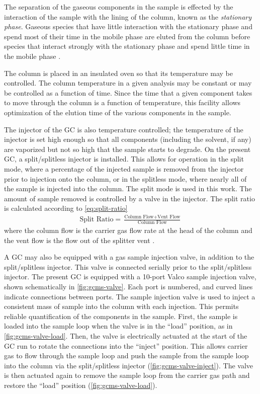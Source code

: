 \documentclass[../main.tex]{subfiles}
\begin{document}
The separation of the gaseous components in the sample is effected by
the interaction of the sample with the lining of the column, known as the
\textit{stationary phase}. Gaseous species that have little interaction with
the stationary phase and spend most of their time in the mobile phase
are eluted from the column before species that interact strongly with
the stationary phase and spend little time in the mobile phase \cite{Sparkman2011a}.

The column is placed in an insulated oven so that its temperature may be
controlled. The column temperature in a given analysis may be constant
or may be controlled as a function of time. Since the time that a given
component takes to move through the column is a function of temperature,
this facility allows optimization of the elution time of the various
components in the sample.

The injector of the GC is also temperature controlled; the temperature of
the injector is set high enough so that all components (including the solvent,
if any) are vaporized but not so high that the sample starts to degrade. On the present GC,
a split/splitless injector is installed. This allows for operation in the
split mode, where a percentage of the injected sample is removed from the
injector prior to injection onto the column, or in the splitless mode,
where nearly all of the sample is injected into the column. The split mode
is used in this work. The amount of sample removed is controlled by a valve
in the injector. The split ratio is calculated according to \cref{eq:split-ratio}
%
\begin{gather}
\label{eq:split-ratio}
\text{Split Ratio} = \frac{\text{Column Flow} +\text{Vent Flow}}{\text{Column Flow}}
\end{gather}
%
where the column flow is the carrier gas flow rate at the head of the column
and the vent flow is the flow out of the splitter vent \cite{Sparkman2011a}.

A GC may also be equipped with a gas sample injection valve, in addition to the
split/splitless injector. This valve is connected serially prior to the
split/splitless injector. The present GC is equipped with a 10-port Valco sample
injection valve, shown schematically in \cref{fig:gcms-valve}.
Each port is numbered, and curved lines indicate connections between ports.
The sample injection valve is used to inject a consistent mass of sample into the column
with each injection. This permits reliable quantification of the
components in the sample. First, the sample is loaded into the sample loop
when the valve is in the ``load'' position, as in \cref{fig:gcms-valve-load}.
Then, the valve is electrically actuated at the start of the
GC run to rotate the connections into the
``inject'' position. This allows carrier gas to flow through the sample loop and push
the sample from the sample loop into the column via the split/splitless injector (\cref{fig:gcms-valve-inject}).
The valve is then actuated again to remove the sample loop
from the carrier gas path and restore the ``load'' position (\cref{fig:gcms-valve-load}).
\end{document}
